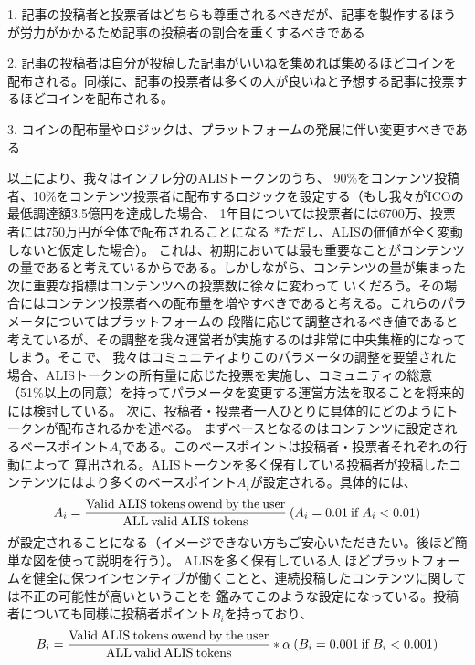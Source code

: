 \documentclass{jsarticle}
\begin{document}
1. 記事の投稿者と投票者はどちらも尊重されるべきだが、記事を製作するほうが労力がかかるため記事の投稿者の割合を重くするべきである 

2. 記事の投稿者は自分が投稿した記事がいいねを集めれば集めるほどコインを配布される。同様に、記事の投票者は多くの人が良いねと予想する記事に投票するほどコインを配布される。 

3. コインの配布量やロジックは、プラットフォームの発展に伴い変更すべきである 

以上により、我々はインフレ分のALISトークンのうち、
90\%をコンテンツ投稿者、10\%をコンテンツ投票者に配布するロジックを設定する（もし我々がICOの最低調達額3.5億円を達成した場合、
1年目については投票者には6700万、投票者には750万円が全体で配布されることになる *ただし、ALISの価値が全く変動しないと仮定した場合）。
これは、初期においては最も重要なことがコンテンツの量であると考えているからである。しかしながら、コンテンツの量が集まった次に重要な指標はコンテンツへの投票数に徐々に変わって
いくだろう。その場合にはコンテンツ投票者への配布量を増やすべきであると考える。これらのパラメータについてはプラットフォームの
段階に応じて調整されるべき値であると考えているが、その調整を我々運営者が実施するのは非常に中央集権的になってしまう。そこで、
我々はコミュニティよりこのパラメータの調整を要望された場合、ALISトークンの所有量に応じた投票を実施し、コミュニティの総意
（51\%以上の同意）を持ってパラメータを変更する運営方法を取ることを将来的には検討している。
次に、投稿者・投票者一人ひとりに具体的にどのようにトークンが配布されるかを述べる。
まずベースとなるのはコンテンツに設定されるベースポイント$A_{i}$である。このベースポイントは投稿者・投票者それぞれの行動によって
算出される。ALISトークンを多く保有している投稿者が投稿したコンテンツにはより多くのベースポイント$A_{i}$が設定される。具体的には、
\begin{align}
A_{i} = \frac{\rm Valid\:ALIS\:tokens\:owend\:by\:the\:user}{\rm ALL\:valid\:ALIS\:tokens}\:(A_{i} = 0.01\:{\rm if}\:A_{i} < 0.01)
\end{align}
が設定されることになる（イメージできない方もご安心いただきたい。後ほど簡単な図を使って説明を行う）。 ALISを多く保有している人
ほどプラットフォームを健全に保つインセンティブが働くことと、連続投稿したコンテンツに関しては不正の可能性が高いということを
鑑みてこのような設定になっている。投稿者についても同様に投稿者ポイント$B_{i}$を持っており、
\begin{align}
B_{i} = \frac{\rm Valid\:ALIS\:tokens\:owend\:by\:the\:user}{\rm ALL\:valid\:ALIS\:tokens} * \alpha \:(B_{i} = 0.001 {\rm\:if\:} B_{i} < 0.001)
\end{align}
\end{document}
